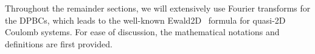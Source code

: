 
Throughout the remainder sections, we will extensively use Fourier transforms for the DPBCs, which leads to the well-known Ewald2D~\cite{parry1975electrostatic, heyes1977molecular, de1979electrostatic} formula for quasi-2D Coulomb systems.
For ease of discussion, the mathematical notations and definitions are first provided.

